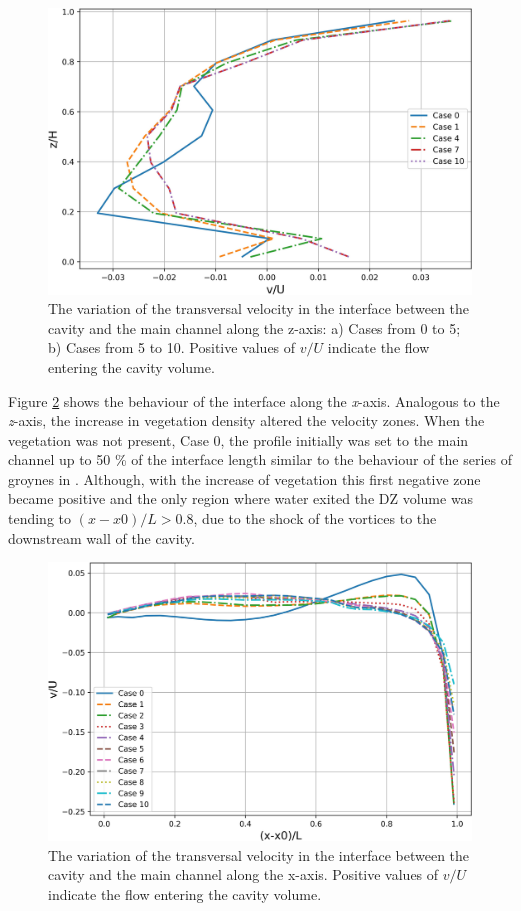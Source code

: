 \begin{figure}[!htb]
\centering
\includegraphics[width=\linewidth]{../images/art4/yVelatInterfaceZAxis.jpg}
\caption{The variation of the transversal velocity in the interface between the cavity and the main channel along the z-axis: a) Cases from 0 to 5; b) Cases from 5 to 10. Positive values of $v/U$ indicate the flow entering the cavity volume.}
\label{fig:art4:yVelatInterfaceZAxis}
\end{figure}

Figure \ref{fig:art4:yVelatInterfaceXAxis} shows the behaviour of the interface along the \textit{x}-axis. Analogous to the \textit{z}-axis, the increase in vegetation density altered the velocity zones. When the vegetation was not present, Case 0, the profile initially was set to the main channel up to 50 \% of the interface length similar to the behaviour of the series of groynes in \textcite{weitbrecht2004}. Although, with the increase of vegetation this first negative zone became positive and the only region where water exited the DZ volume was tending to $(x-x0)/L > 0.8$, due to the shock of the vortices to the downstream wall of the cavity.

\begin{figure}[!htb]
\centering
\includegraphics[width=\linewidth]{../images/art4/yVelatInterfaceXAxis.jpg}
\caption{The variation of the transversal velocity in the interface between the cavity and the main channel along the x-axis. Positive values of $v/U$ indicate the flow entering the cavity volume.}
\label{fig:art4:yVelatInterfaceXAxis}
\end{figure}

